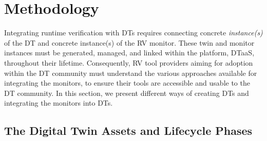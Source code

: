 \section{Methodology}\label{sec:methodology}
Integrating runtime verification with DTs requires connecting concrete \emph{instance(s)} of the DT and concrete instance(s) of the RV monitor.
These twin and monitor instances must be generated, managed, and linked within the platform, DTaaS, throughout their lifetime.
Consequently, RV tool providers aiming for adoption within the DT community must understand the various approaches available for integrating the monitors, to ensure their tools are accessible and usable to the DT community.
In this section, we present different ways of creating DTs and integrating the monitors into DTs.


\subsection{The Digital Twin Assets and Lifecycle Phases}
\label{sec:dt-integration}

